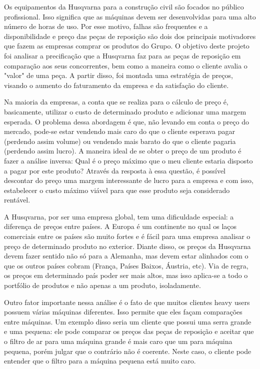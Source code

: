 \documentclass[12pt]{article}
\begin{document}
	Os equipamentos da Husqvarna para a construção civil são focados no público profissional. Isso significa que as máquinas devem ser desenvolvidas para uma alto número de horas de uso. Por esse motivo, falhas são frequentes e a disponibilidade e preço das peças de reposição são dois dos principais motivadores que fazem as empresas comprar os produtos do Grupo. O objetivo deste projeto foi analisar a precificação que a Husqvarna faz para as peças de reposição em comparação aos seus concorrentes, bem como a maneira como o cliente avalia o "valor" de uma peça. A partir disso, foi montada uma estratégia de preços, visando o aumento do faturamento da empresa e da satisfação do cliente.

	Na maioria da empresas, a conta que se realiza para o cálculo de preço é, basicamente, utilizar o custo de determinado produto e adicionar uma margem esperada. O problema dessa abordagem é que, não levando em conta o preço do mercado, pode-se estar vendendo mais caro do que o cliente esperava pagar (perdendo assim volume) ou vendendo mais barato do que o cliente pagaria (perdendo assim lucro). A maneira ideal de se obter o preço de um produto é fazer a análise inversa: Qual é o preço máximo que o meu cliente estaria disposto a pagar por este produto? Através da resposta à essa questão, é possível descontar do preço uma margem interessante de lucro para a empresa e com isso, estabelecer o custo máximo viável para que esse produto seja considerado rentável.

	A Husqvarna, por ser uma empresa global, tem uma dificuldade especial: a diferença de preços entre países. A Europa é um continente no qual os laços comerciais entre os países são muito fortes e é fácil para uma empresa analisar o preço de determinado produto no exterior. Diante disso, os preços da Husqvarna devem fazer sentido não só para a Alemanha, mas devem estar alinhados com o que os outros países cobram (França, Países Baixos, Áustria, etc). Via de regra, os preços em determinado país poder ser mais altos, mas isso aplica-se a todo o portfólio de produtos e não apenas a um produto, isoladamente.

	Outro fator importante nessa análise é o fato de que muitos clientes heavy users possuem várias máquinas diferentes. Isso permite que eles façam comparações entre máquinas. Um exemplo disso seria um cliente que possui uma serra grande e uma pequena: ele pode comparar os preços das peças de reposição e aceitar que o filtro de ar para uma máquina grande é mais caro que um para máquina pequena, porém julgar que o contrário não é coerente. Neste caso, o cliente pode entender que o filtro para a máquina pequena está muito caro.
\end{document}
